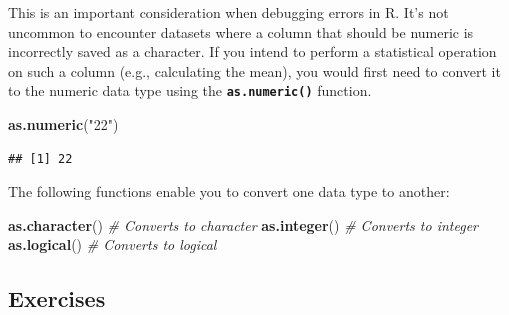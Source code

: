 \documentclass[
]{book}
\newenvironment{Shaded}{\begin{snugshade}}{\end{snugshade}}
\newcommand{\CommentTok}[1]{\textcolor[rgb]{0.56,0.35,0.01}{\textit{#1}}}
\newcommand{\FunctionTok}[1]{\textcolor[rgb]{0.13,0.29,0.53}{\textbf{#1}}}
\newcommand{\NormalTok}[1]{#1}
\newcommand{\StringTok}[1]{\textcolor[rgb]{0.31,0.60,0.02}{#1}}
\begin{document}
This is an important consideration when debugging errors in R. It's not uncommon to encounter datasets where a column that should be numeric is incorrectly saved as a character. If you intend to perform a statistical operation on such a column (e.g., calculating the mean), you would first need to convert it to the numeric data type using the \textbf{\texttt{as.numeric()}} function.

\begin{Shaded}
\begin{Highlighting}[]
\FunctionTok{as.numeric}\NormalTok{(}\StringTok{"22"}\NormalTok{)}
\end{Highlighting}
\end{Shaded}

\begin{verbatim}
## [1] 22
\end{verbatim}

The following functions enable you to convert one data type to another:

\begin{Shaded}
\begin{Highlighting}[]
\FunctionTok{as.character}\NormalTok{()  }\CommentTok{\# Converts to character}
\FunctionTok{as.integer}\NormalTok{()    }\CommentTok{\# Converts to integer}
\FunctionTok{as.logical}\NormalTok{()    }\CommentTok{\# Converts to logical}
\end{Highlighting}
\end{Shaded}

\hypertarget{exercises-1}{%
\subsection{Exercises}\label{exercises-1}}
\end{document}

